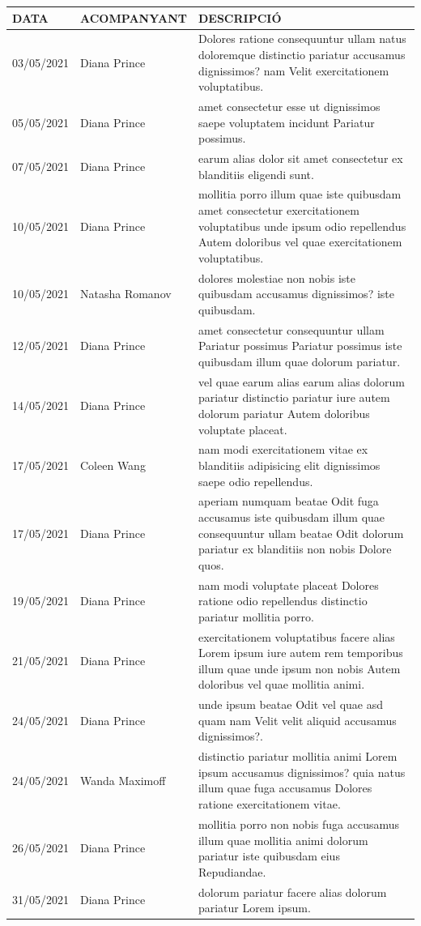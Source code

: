 \documentclass[a4paper,12pt]{elsarticle}  %
\begin{document}
	\begin{longtable}{p{}lp{}}
		

		
		\hline
		\textbf{DATA} & \textbf{ACOMPANYANT} & \textbf{DESCRIPCIÓ}\\
		\hline
			 03/05/2021 & Diana Prince & Dolores ratione consequuntur ullam natus doloremque distinctio pariatur accusamus dignissimos? nam Velit exercitationem voluptatibus. \\ 
			 05/05/2021 & Diana Prince & amet consectetur esse ut dignissimos saepe voluptatem incidunt Pariatur possimus. \\ 
			 07/05/2021 & Diana Prince & earum alias dolor sit amet consectetur ex blanditiis eligendi sunt. \\ 
			 10/05/2021 & Diana Prince & mollitia porro illum quae iste quibusdam amet consectetur exercitationem voluptatibus unde ipsum odio repellendus Autem doloribus vel quae exercitationem voluptatibus. \\ 
			 10/05/2021 & Natasha Romanov & dolores molestiae non nobis iste quibusdam accusamus dignissimos? iste quibusdam. \\ 
			 12/05/2021 & Diana Prince & amet consectetur consequuntur ullam Pariatur possimus Pariatur possimus iste quibusdam illum quae dolorum pariatur. \\ 
			 14/05/2021 & Diana Prince & vel quae earum alias earum alias dolorum pariatur distinctio pariatur iure autem dolorum pariatur Autem doloribus voluptate placeat. \\ 
			 17/05/2021 & Coleen Wang & nam modi exercitationem vitae ex blanditiis adipisicing elit dignissimos saepe odio repellendus. \\ 
			 17/05/2021 & Diana Prince & aperiam numquam beatae Odit fuga accusamus iste quibusdam illum quae consequuntur ullam beatae Odit dolorum pariatur ex blanditiis non nobis Dolore quos. \\ 
			 19/05/2021 & Diana Prince & nam modi voluptate placeat Dolores ratione odio repellendus distinctio pariatur mollitia porro. \\ 
			 21/05/2021 & Diana Prince & exercitationem voluptatibus facere alias Lorem ipsum iure autem rem temporibus illum quae unde ipsum non nobis Autem doloribus vel quae mollitia animi. \\ 
			 24/05/2021 & Diana Prince & unde ipsum beatae Odit vel quae asd quam nam Velit velit aliquid accusamus dignissimos?. \\ 
			 24/05/2021 & Wanda Maximoff & distinctio pariatur mollitia animi Lorem ipsum accusamus dignissimos? quia natus illum quae fuga accusamus Dolores ratione exercitationem vitae. \\ 
			 26/05/2021 & Diana Prince & mollitia porro non nobis fuga accusamus illum quae mollitia animi dolorum pariatur iste quibusdam eius Repudiandae. \\ 
			 31/05/2021 & Diana Prince & dolorum pariatur facere alias dolorum pariatur Lorem ipsum. \\ 
		
	\end{longtable}
\end{document}
